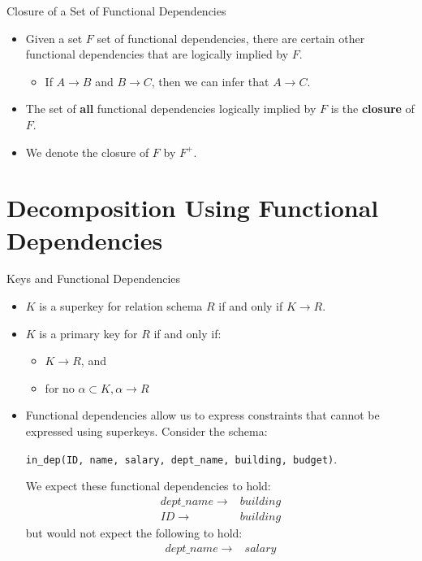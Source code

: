 \documentclass{beamer}
\begin{document}
\begin{frame}{Closure of a Set of Functional Dependencies}
    \begin{itemize}
        \item Given a set $F$ set of functional dependencies, there are certain other functional dependencies that are logically implied by $F$.
        \begin{itemize}
            \item If $A \rightarrow B$ and $B \rightarrow C$, then we can infer that $A \rightarrow C$.
        \end{itemize}
        \item The set of \textbf{all} functional dependencies logically implied by $F$ is the \textbf{closure} of $F$.
        \item We denote the closure of $F$ by $F^+$.
    \end{itemize}
\end{frame}

\section{Decomposition Using Functional Dependencies}

\begin{frame}{Keys and Functional Dependencies}
    \begin{itemize}
        \item $K$ is a superkey for relation schema $R$ if and only if $K \rightarrow R$.
        \item $K$ is a primary key for $R$ if and only if:
        \begin{itemize}
            \item $K \rightarrow R$, and
            \item for no $\alpha \subset K, \alpha \rightarrow R$
        \end{itemize}
        \item Functional dependencies allow us to express constraints that cannot be expressed using superkeys. Consider the schema:
            \begin{center}
                \texttt{\footnotesize in\_dep(ID, name, salary, dept\_name, building, budget)}.
            \end{center}
        We expect these functional dependencies to hold:
            \begin{equation*}
                \begin{align*}
                    dept\_name \rightarrow& building \\
                    ID \rightarrow& building
                \end{align*}
            \end{equation*}
        but would not expect the following to hold:
            \begin{equation*}
                \begin{align*}
                    dept\_name \rightarrow& salary
                \end{align*}
            \end{equation*}
    \end{itemize}
\end{frame}
\end{document}
